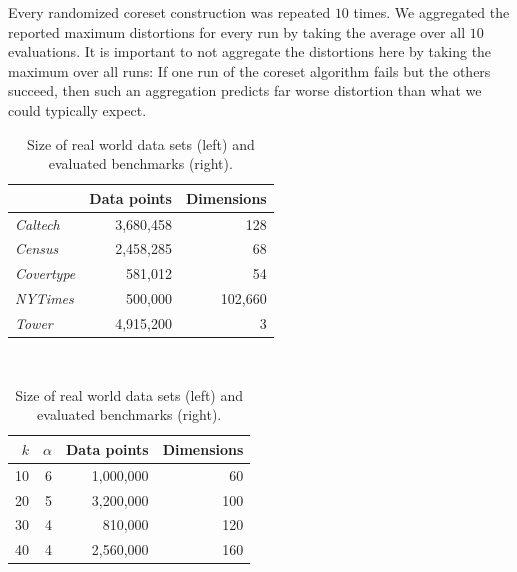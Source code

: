 Every randomized coreset construction was repeated $10$ times. We aggregated the reported maximum distortions for every run by taking the average over all $10$ evaluations. 
It is important to not aggregate the distortions here by taking the maximum over all runs: If one run of the coreset algorithm fails but the others succeed, then such an aggregation predicts far worse distortion than what we could typically expect.


\begin{center}
\begin{table}
\begin{minipage}{0.49\textwidth}
	\begin{tabular}{lrr}
		\toprule
        
		    & Data points
		    & Dimensions
            \\
		\midrule
		\textit{Caltech}
    		& 3,680,458
    		& 128
    		\\
		\textit{Census}
    		& 2,458,285
    		& 68
    		\\
	    \textit{Covertype}
    	    & 581,012
    		& 54
    		\\
	    \textit{NYTimes}
    	    & 500,000
    		& 102,660
    		\\
        \textit{Tower}
            & 4,915,200
    		& 3
    		\\
		\bottomrule
	\end{tabular}\\
\end{minipage}
\begin{minipage}{0.49\textwidth}
	\begin{tabular}{rrrr}
		\toprule
        $k$
		    & $\alpha$
		    & Data points
		    & Dimensions
            \\
		\midrule
        10
    		& 6
    		& 1,000,000
    		& 60
    		\\
        20
    		& 5
    		& 3,200,000
    		& 100
    		\\
        30
    		& 4
    		& 810,000
    		& 120
    		\\
        40
    		& 4
    		& 2,560,000
    		& 160
    		\\
		\bottomrule
	\end{tabular}\\
\end{minipage}
\caption{Size of real world data sets (left) and evaluated benchmarks (right).}
\label{tab:real-world-datasets-overview}
\end{table}
\end{center}



